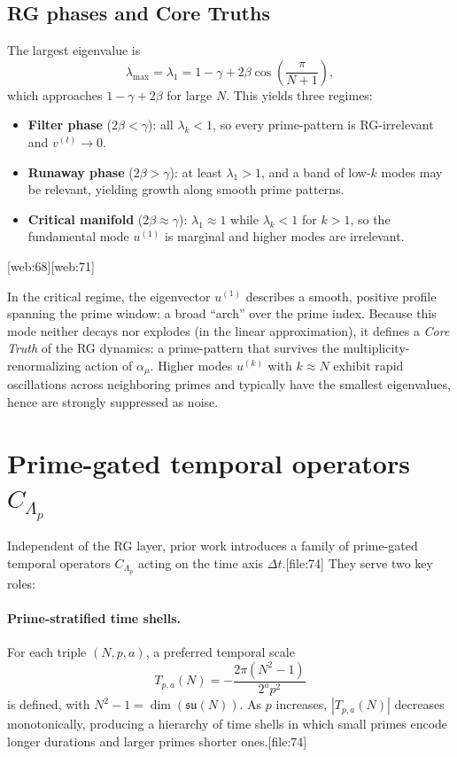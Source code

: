 \documentclass[11pt]{article}
\begin{document}
\subsection{RG phases and Core Truths}

The largest eigenvalue is
\begin{equation}
    \lambda_{\max} = \lambda_1
    = 1 - \gamma + 2\beta \cos\left(\frac{\pi}{N+1}\right),
\end{equation}
which approaches $1 - \gamma + 2\beta$ for large $N$.
This yields three regimes:
\begin{itemize}
    \item \textbf{Filter phase} ($2\beta < \gamma$): all $\lambda_k < 1$, so every prime-pattern is RG-irrelevant and $v^{(t)} \to 0$.
    \item \textbf{Runaway phase} ($2\beta > \gamma$): at least $\lambda_1 > 1$, and a band of low-$k$ modes may be relevant, yielding growth along smooth prime patterns.
    \item \textbf{Critical manifold} ($2\beta \approx \gamma$): $\lambda_1 \approx 1$ while $\lambda_k<1$ for $k>1$, so the fundamental mode $u^{(1)}$ is marginal and higher modes are irrelevant.
\end{itemize}[web:68][web:71]

In the critical regime, the eigenvector $u^{(1)}$ describes a smooth, positive profile spanning the prime window: a broad ``arch'' over the prime index.
Because this mode neither decays nor explodes (in the linear approximation), it defines a \emph{Core Truth} of the RG dynamics: a prime-pattern that survives the multiplicity-renormalizing action of $\alpha_\mu$.
Higher modes $u^{(k)}$ with $k \approx N$ exhibit rapid oscillations across neighboring primes and typically have the smallest eigenvalues, hence are strongly suppressed as noise.

\section{Prime-gated temporal operators $C_{\Lambda_p}$}

Independent of the RG layer, prior work introduces a family of prime-gated temporal operators $C_{\Lambda_p}$ acting on the time axis $\Delta t$.[file:74]
They serve two key roles:

\paragraph{Prime-stratified time shells.}
For each triple $(N,p,a)$, a preferred temporal scale
\begin{equation}
    T_{p,a}(N) = -\frac{2\pi (N^2 - 1)}{2^a p^2}
\end{equation}
is defined, with $N^2 - 1 = \dim(\mathfrak{su}(N))$.
As $p$ increases, $|T_{p,a}(N)|$ decreases monotonically, producing a hierarchy of time shells in which small primes encode longer durations and larger primes shorter ones.[file:74]
\end{document}
